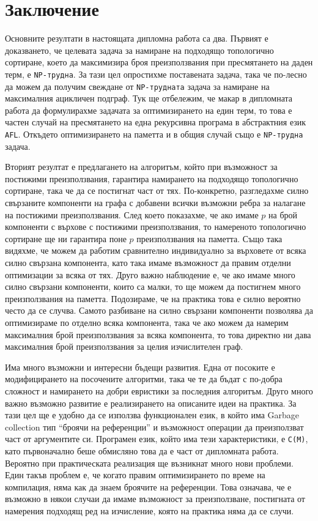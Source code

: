 \documentclass[12pt,twoside,a4paper]{article}
\begin{document}
	\clearpage
	\section*{Заключение}
	Основните резултати в настоящата дипломна работа са два. Първият е доказването, че целевата задача за намиране на подходящо топологично сортиране, което да максимизира броя преизползвания при пресмятането на даден терм, е \texttt{NP-трудна}. За тази цел опростихме поставената задача, така че по-лесно да можем да получим свеждане от \texttt{NP-трудната} задача за намиране на максималния ацикличен подграф. Тук ще отбележим, че макар в дипломната работа да формулирахме задачата за оптимизирането на един терм, то това е частен случай на пресмятането на една рекурсивна програма в абстрактния език \texttt{AFL}. Откъдето оптимизирането на паметта и в общия случай също е \texttt{NP-трудна} задача.
	
	Вторият резултат е предлагането на алгоритъм, който при възможност за постижими преизползвания, гарантира намирането на подходящо топологично сортиране, така че да се постигнат част от тях. По-конкретно, разгледахме силно свързаните компоненти на графа с добавени всички възможни ребра за налагане на постижими преизползвания. След което показахме, че ако имаме $p$ на брой компоненти с върхове с постижими преизползвания, то намереното топологично сортиране ще ни гарантира поне $p$ преизползвания на паметта. Също така видяхме, че можем да работим сравнително индивидуално за върховете от всяка силно свързана компонента, като така имаме възможност да правим отделни оптимизации за всяка от тях. Друго важно наблюдение е, че ако имаме много силно свързани компоненти, които са малки, то ще можем да постигнем много преизползвания на паметта. Подозираме, че на практика това е силно вероятно често да се случва. Самото разбиване на силно свързани компоненти позволява да оптимизираме по отделно всяка компонента, така че ако можем да намерим максималния брой преизползвания за всяка компонента, то това директно ни дава максималния брой преизползвания за целия изчислителен граф.
	
	Има много възможни и интересни бъдещи развития. Една от посоките е модифицирането на посочените алгоритми, така че те да бъдат с по-добра сложност и намирането на добри евристики за последния алгоритъм. Друго много важно възможно развитие е реализирането на описаните идеи на практика. За тази цел ще е удобно да се използва функционален език, в който има Garbage collection тип "`броячи на референции"' и възможност операции да преизползват част от аргументите си. Програмен език, който има тези характеристики, е \texttt{C(M)}\cite{CM}, като първоначално беше обмисляно това да е част от дипломната работа. Вероятно при практическата реализация ще възникнат много нови проблеми. Един такъв проблем е, че когато правим оптимизирането по време на компилация, няма как да знаем броячите на референции. Това означава, че е възможно в някои случаи да имаме възможност за преизползване, постигната от намерения подходящ ред на изчисление, която на практика няма да се случи.
	
	\clearpage
	\printbibliography[
	heading=bibintoc,
	title={Литература}
	]
\end{document}
